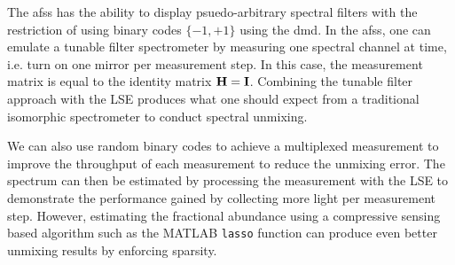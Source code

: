 The \acrfull{afss} has the ability to display psuedo-arbitrary spectral filters with the restriction of using binary codes $ \{ -1, +1 \}$ using the \gls{dmd}. In the \gls{afss}, one can emulate a tunable filter spectrometer by measuring one spectral channel at time, i.e. turn on one mirror per measurement step. In this case, the measurement matrix is equal to the identity matrix $\displaystyle \mathbf{H} = \displaystyle \mathbf{I}$. Combining the tunable filter approach with the LSE produces what one should expect from a traditional isomorphic spectrometer to conduct spectral unmixing.

We can also use random binary codes to achieve a multiplexed measurement to improve the throughput of each measurement to reduce the unmixing error. The spectrum can then be estimated by processing the measurement with the LSE to demonstrate the performance gained by collecting more light per measurement step. However, estimating the fractional abundance using a compressive sensing based algorithm such as the MATLAB \texttt{lasso} function can produce even better unmixing results by enforcing sparsity. 

